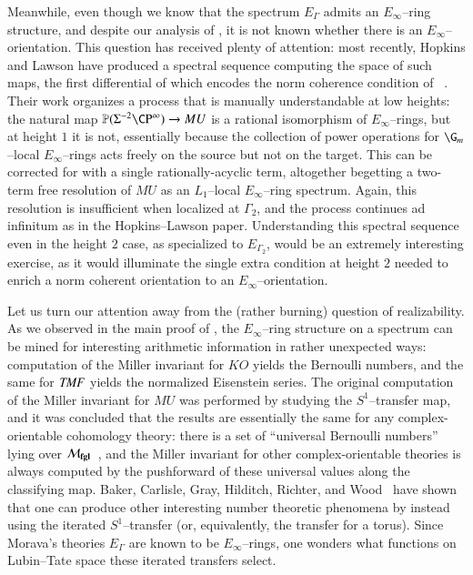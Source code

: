 Meanwhile, even though we know that the spectrum $E_\Gamma$ admits an $E_\infty$--ring structure, and despite our analysis of , it is not known whether there is an $E_\infty$--orientation.  This question has received plenty of attention: most recently, Hopkins and Lawson have produced a spectral sequence computing the space of such maps, the first differential of which encodes the norm coherence condition of ~\cite{HopkinsLawson}.  Their work organizes a process that is manually understandable at low heights: the natural map $\mathbb P(\Susp^{-2} \CP^\infty) \to MU$ is a rational isomorphism of $E_\infty$--rings, but at height $1$ it is not, essentially because the collection of power operations for $\G_m$--local $E_\infty$--rings acts freely on the source but not on the target.  This can be corrected for with a single rationally-acyclic term, altogether begetting a two-term free resolution of $MU$ as an $L_1$--local $E_\infty$--ring spectrum.  Again, this resolution is insufficient when localized at $\Gamma_2$, and the process continues ad infinitum as in the Hopkins--Lawson paper.  Understanding this spectral sequence even in the height $2$ case, as specialized to $E_{\Gamma_2}$, would be an extremely interesting exercise, as it would illuminate the single extra condition at height $2$ needed to enrich a norm coherent orientation to an $E_\infty$--orientation.







Let us turn our attention away from the (rather burning) question of realizability.  As we observed in the main proof of , the $E_\infty$--ring structure on a spectrum can be mined for interesting arithmetic information in rather unexpected ways: computation of the Miller invariant for $KO$ yields the Bernoulli numbers, and the same for $\mathit{TMF}$ yields the normalized Eisenstein series.  The original computation of the Miller invariant for $MU$ was performed by studying the $S^1$--transfer map, and it was concluded that the results are essentially the same for any complex-orientable cohomology theory: there is a set of ``universal Bernoulli numbers'' lying over $\mathcal{M}_{\mathbf{fgl}}$~\cite{MillerBernoulliNos}, and the Miller invariant for other complex-orientable theories is always computed by the pushforward of these universal values along the classifying map.  Baker, Carlisle, Gray, Hilditch, Richter, and Wood~\cite{BCGHRW} have shown that one can produce other interesting number theoretic phenomena by instead using the iterated $S^1$--transfer (or, equivalently, the transfer for a torus).  Since Morava's theories $E_\Gamma$ are known to be $E_\infty$--rings, one wonders what functions on Lubin--Tate space these iterated transfers select.


